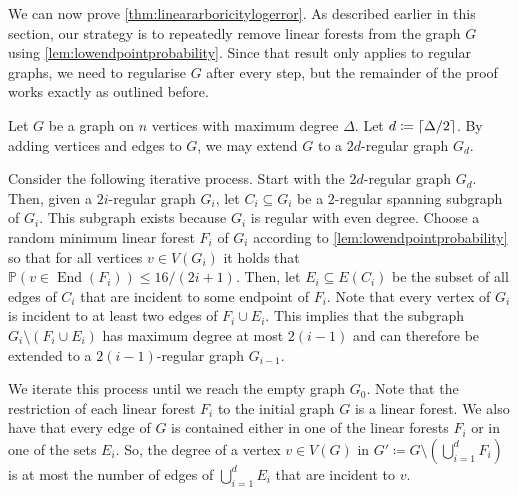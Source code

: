 \documentclass[11pt]{article}
\makeatletter
\theoremstyle{plain}
\theoremstyle{definition}
\renewenvironment{proof}[1][\proofname]
{\par\pushQED{\qed}
	\normalfont\topsep6\p@\@plus6\p@\relax\trivlist
	\item[\hskip\labelsep\bfseries#1\@addpunct{.}]
	\ignorespaces}
{\popQED\endtrivlist\@endpefalse}
\newcommand{\pr}{\mathbb{P}}
\DeclarePairedDelimiter{\ceil}{\lceil}{\rceil}
\DeclareMathOperator{\End}{End}
\makeatother
\begin{document}
We can now prove \cref{thm:lineararboricitylogerror}. As described earlier in this section, our strategy is to repeatedly remove linear forests from the graph $G$ using \cref{lem:lowendpointprobability}. Since that result only applies to regular graphs, we need to regularise $G$ after every step, but the remainder of the proof works exactly as outlined before.

\begin{proof}[Proof of \cref{thm:lineararboricitylogerror}]
    Let $G$ be a graph on $n$ vertices with maximum degree $\Delta$. Let $d \coloneqq \ceil{\Delta/2}$. By adding vertices and edges to $G$, we may extend $G$ to a $2d$-regular graph $G_d$.

    Consider the following iterative process. Start with the $2d$-regular graph $G_d$. Then, given a $2i$-regular graph $G_i$, let $C_i \subseteq G_i$ be a $2$-regular spanning subgraph of $G_i$. This subgraph exists because $G_i$ is regular with even degree. Choose a random minimum linear forest $F_i$ of $G_i$ according to \cref{lem:lowendpointprobability} so that for all vertices $v \in V(G_i)$ it holds that $\pr(v \in \End(F_i)) \le 16/(2i+1)$. Then, let $E_i \subseteq E(C_i)$ be the subset of all edges of $C_i$ that are incident to some endpoint of $F_i$. Note that every vertex of $G_i$ is incident to at least two edges of $F_i \cup E_i$. This implies that the subgraph $G_i \setminus (F_i \cup E_i)$ has maximum degree at most $2(i-1)$ and can therefore be extended to a $2(i-1)$-regular graph $G_{i-1}$.

    We iterate this process until we reach the empty graph $G_0$. Note that the restriction of each linear forest $F_i$ to the initial graph $G$ is a linear forest. We also have that every edge of $G$ is contained either in one of the linear forests $F_i$ or in one of the sets $E_i$. So, the degree of a vertex $v \in V(G)$ in $G' \coloneqq G \setminus (\bigcup_{i=1}^d F_i)$ is at most the number of edges of $\bigcup_{i=1}^d E_i$ that are incident to $v$.


\end{proof}
\end{document}
